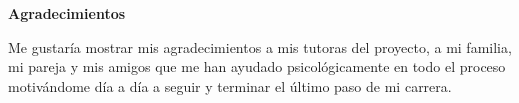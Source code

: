 \begin{center}
	\bigskip
	\bigskip
	\textbf{\huge {Agradecimientos}}\\
	\bigskip
\end{center}

Me gustaría mostrar mis agradecimientos a mis tutoras del proyecto, a mi familia, mi pareja y mis amigos que me han ayudado psicológicamente en todo el proceso motivándome día a día a seguir y terminar el último paso de mi carrera.